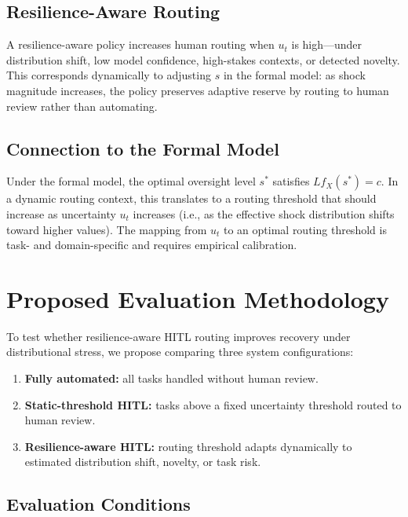 \documentclass[11pt,a4paper]{article}
\theoremstyle{definition}
\theoremstyle{plain}
\theoremstyle{remark}
\begin{document}
\subsection{Resilience-Aware Routing}

A resilience-aware policy increases human routing when $u_t$ is high---under distribution shift, low model confidence, high-stakes contexts, or detected novelty. This corresponds dynamically to adjusting $s$ in the formal model: as shock magnitude increases, the policy preserves adaptive reserve by routing to human review rather than automating.

\subsection{Connection to the Formal Model}

Under the formal model, the optimal oversight level $s^*$ satisfies $L f_X(s^*) = c$. In a dynamic routing context, this translates to a routing threshold that should increase as uncertainty $u_t$ increases (i.e., as the effective shock distribution shifts toward higher values). The mapping from $u_t$ to an optimal routing threshold is task- and domain-specific and requires empirical calibration.

\section{Proposed Evaluation Methodology}\label{sec:evaluation}

To test whether resilience-aware HITL routing improves recovery under distributional stress, we propose comparing three system configurations:

\begin{enumerate}
  \item \textbf{Fully automated:} all tasks handled without human review.
  \item \textbf{Static-threshold HITL:} tasks above a fixed uncertainty threshold routed to human review.
  \item \textbf{Resilience-aware HITL:} routing threshold adapts dynamically to estimated distribution shift, novelty, or task risk.
\end{enumerate}

\subsection{Evaluation Conditions}
\end{document}
